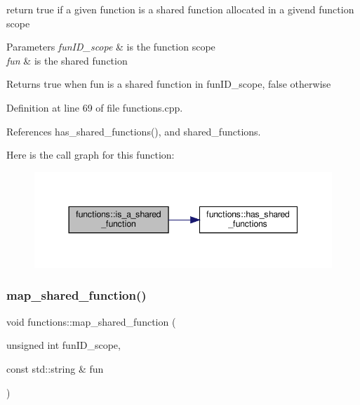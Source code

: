 return true if a given function is a shared function allocated in a givend function scope 


\begin{DoxyParams}{Parameters}
{\em fun\+I\+D\+\_\+scope} & is the function scope \\
\hline
{\em fun} & is the shared function \\
\hline
\end{DoxyParams}
\begin{DoxyReturn}{Returns}
true when fun is a shared function in fun\+I\+D\+\_\+scope, false otherwise 
\end{DoxyReturn}


Definition at line 69 of file functions.\+cpp.



References has\+\_\+shared\+\_\+functions(), and shared\+\_\+functions.

Here is the call graph for this function\+:
\nopagebreak
\begin{figure}[H]
\begin{center}
\leavevmode
\includegraphics[width=344pt]{dd/d03/classfunctions_a931331a26c67b312ee68dce38648046f_cgraph}
\end{center}
\end{figure}
\mbox{\label{classfunctions_aa00c291ca69a502b86be3e3cfda701fc}} 
\subsubsection{\texorpdfstring{map\+\_\+shared\+\_\+function()}{map\_shared\_function()}}
{\footnotesize\ttfamily void functions\+::map\+\_\+shared\+\_\+function (\begin{DoxyParamCaption}\item[{unsigned int}]{fun\+I\+D\+\_\+scope,  }\item[{const std\+::string \&}]{fun }\end{DoxyParamCaption})}



